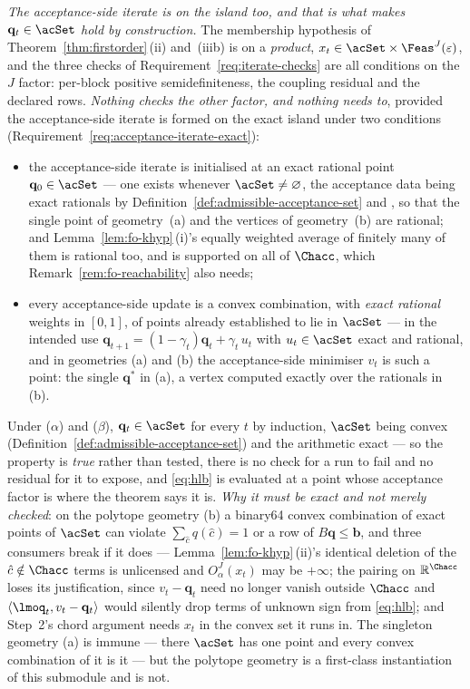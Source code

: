 \begin{remark}
\emph{The acceptance-side iterate is on the island too, and that is what
makes $\mathbf q_t\in\acSet$ hold by construction.} The membership
hypothesis of Theorem~\ref{thm:firstorder}\,(ii) and~(iiib) is on a
\emph{product}, $x_t\in\acSet\times\Feas^{J}(\varepsilon)$, and the three
checks of Requirement~\ref{req:iterate-checks} are all conditions on the $J$
factor: per-block positive semidefiniteness, the coupling residual and the
declared rows. \emph{Nothing checks the other factor, and nothing needs
to}, provided the acceptance-side iterate is formed on the exact island
under two conditions (Requirement~\ref{req:acceptance-iterate-exact}):
\begin{itemize}[leftmargin=2.4em]
\item[($\alpha$)] the acceptance-side iterate is initialised at an exact
rational point $\mathbf q_{0}\in\acSet$ --- one exists whenever
$\acSet\neq\varnothing$, the acceptance data being exact rationals by
Definition~\ref{def:admissible-acceptance-set} and , so that
the single point of geometry~(a) and the vertices of geometry~(b) are
rational; and Lemma~\ref{lem:fo-khyp}\,(i)'s equally weighted average of
finitely many of them is rational too, and is supported on all of
$\Chacc$, which Remark~\ref{rem:fo-reachability} also needs;
\item[($\beta$)] every acceptance-side update is a convex combination,
with \emph{exact rational} weights in $[0,1]$, of points already
established to lie in $\acSet$ --- in the intended use
$\mathbf q_{t+1}=(1-\gamma_t)\mathbf q_t+\gamma_t\,u_t$ with
$u_t\in\acSet$ exact and rational, and in geometries (a) and (b) the
acceptance-side minimiser $v_t$ is such a point: the single
$\mathbf q^{*}$ in (a), a vertex computed exactly over the rationals in
(b).
\end{itemize}
Under ($\alpha$) and ($\beta$), $\mathbf q_t\in\acSet$ for every $t$ by
induction, $\acSet$ being convex (Definition~\ref{def:admissible-acceptance-set}) and the
arithmetic exact --- so the property is \emph{true} rather than tested,
there is no check for a run to fail and no residual for it to expose, and
\eqref{eq:hlb} is evaluated at a point whose acceptance factor is where
the theorem says it is. \emph{Why it must be exact and not merely
checked}: on the polytope geometry (b) a binary64 convex combination of
exact points of $\acSet$ can violate $\sum_{\hat c}q(\hat c)=1$ or a row
of $B\mathbf q\le\mathbf b$, and three consumers break if it does ---
Lemma~\ref{lem:fo-khyp}\,(ii)'s identical deletion of the
$\hat c\notin\Chacc$ terms is unlicensed and $O^{J}_{\alpha}(x_t)$ may be
$+\infty$; the pairing on $\mathbb{R}^{\Chacc}$ loses its justification,
since $v_t-\mathbf q_t$ need no longer vanish outside $\Chacc$ and
$\langle\lmoq_t,v_t-\mathbf q_t\rangle$ would silently drop terms of
unknown sign from \eqref{eq:hlb}; and Step~2's chord argument needs $x_t$
in the convex set it runs in. The singleton geometry (a) is immune ---
there $\acSet$ has one point and every convex combination of it is it ---
but the polytope geometry is a first-class instantiation of this submodule
and is not.


\end{remark}
